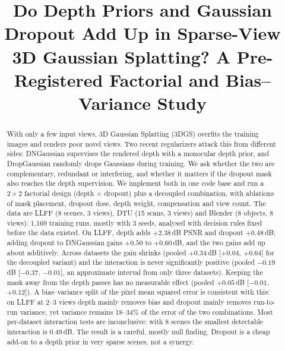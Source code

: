 \documentclass[conference]{IEEEtran}
\newcommand{\dB}{\,dB}
\begin{document}
\title{Do Depth Priors and Gaussian Dropout Add Up in Sparse-View 3D Gaussian Splatting? A Pre-Registered Factorial and Bias--Variance Study}

\author{
}

\maketitle

\begin{abstract}
With only a few input views, 3D Gaussian Splatting (3DGS) overfits the training images and renders poor novel views. Two recent regularizers attack this from different sides: DNGaussian supervises the rendered depth with a monocular depth prior, and DropGaussian randomly drops Gaussians during training. We ask whether the two are complementary, redundant or interfering, and whether it matters if the dropout mask also reaches the depth supervision. We implement both in one code base and run a $2\times2$ factorial design (depth $\times$ dropout) plus a decoupled combination, with ablations of mask placement, dropout dose, depth weight, compensation and view count. The data are LLFF (8 scenes, 3 views), DTU (15 scans, 3 views) and Blender (8 objects, 8 views): 1,169 training runs, mostly with 3 seeds, analysed with decision rules fixed before the data existed. On LLFF, depth adds $+2.38$\dB{} PSNR and dropout $+0.48$\dB; adding dropout to DNGaussian gains $+0.50$ to $+0.60$\dB, and the two gains add up about additively. Across datasets the gain shrinks (pooled $+0.34$\dB{} [$+0.04$, $+0.64$] for the decoupled variant) and the interaction is never significantly positive (pooled $-0.19$\dB{} [$-0.37$, $-0.01$], an approximate interval from only three datasets). Keeping the mask away from the depth passes has no measurable effect (pooled $+0.05$\dB{} [$-0.01$, $+0.12$]). A bias--variance split of the pixel mean squared error is consistent with this: on LLFF at 2--3 views depth mainly removes bias and dropout mainly removes run-to-run variance, yet variance remains 18--34\% of the error of the two combinations. Most per-dataset interaction tests are inconclusive: with 8 scenes the smallest detectable interaction is 0.49\dB. The result is a careful, mostly null finding. Dropout is a cheap add-on to a depth prior in very sparse scenes, not a synergy.
\end{abstract}
\end{document}
